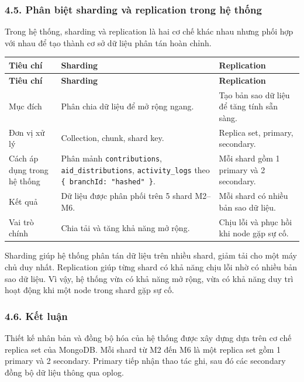 \documentclass[12pt,a4paper]{article}
\begin{document}
\subsubsection*{4.5. Phân biệt sharding và replication trong hệ thống}

Trong hệ thống, sharding và replication là hai cơ chế khác nhau nhưng phối hợp với nhau để tạo thành cơ sở dữ liệu phân tán hoàn chỉnh.

\begin{center}
\small
\begin{longtable}{|p{2.4cm}|p{4.5cm}|p{4.9cm}|}
\hline
\textbf{Tiêu chí} & \textbf{Sharding} & \textbf{Replication} \\ \hline
\endfirsthead
\hline
\textbf{Tiêu chí} & \textbf{Sharding} & \textbf{Replication} \\ \hline
\endhead
Mục đích & Phân chia dữ liệu để mở rộng ngang. & Tạo bản sao dữ liệu để tăng tính sẵn sàng. \\ \hline
Đơn vị xử lý & Collection, chunk, shard key. & Replica set, primary, secondary. \\ \hline
Cách áp dụng trong hệ thống & Phân mảnh \texttt{contributions}, \texttt{aid\_distributions}, \texttt{activity\_logs} theo \texttt{\{ branchId: "hashed" \}}. & Mỗi shard gồm 1 primary và 2 secondary. \\ \hline
Kết quả & Dữ liệu được phân phối trên 5 shard M2--M6. & Mỗi shard có nhiều bản sao dữ liệu. \\ \hline
Vai trò chính & Chia tải và tăng khả năng mở rộng. & Chịu lỗi và phục hồi khi node gặp sự cố. \\ \hline
\end{longtable}
\normalsize
\end{center}

Sharding giúp hệ thống phân tán dữ liệu trên nhiều shard, giảm tải cho một máy chủ duy nhất. Replication giúp từng shard có khả năng chịu lỗi nhờ có nhiều bản sao dữ liệu. Vì vậy, hệ thống vừa có khả năng mở rộng, vừa có khả năng duy trì hoạt động khi một node trong shard gặp sự cố.

\subsubsection*{4.6. Kết luận}

Thiết kế nhân bản và đồng bộ hóa của hệ thống được xây dựng dựa trên cơ chế replica set của MongoDB. Mỗi shard từ M2 đến M6 là một replica set gồm 1 primary và 2 secondary. Primary tiếp nhận thao tác ghi, sau đó các secondary đồng bộ dữ liệu thông qua oplog.
\end{document}
